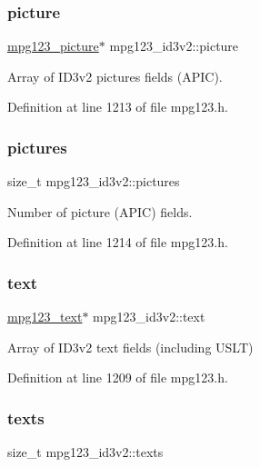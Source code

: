 \subsubsection{\texorpdfstring{picture}{picture}}
{\footnotesize\ttfamily \mbox{\hyperlink{structmpg123__picture}{mpg123\+\_\+picture}}$\ast$ mpg123\+\_\+id3v2\+::picture}

Array of I\+D3v2 pictures fields (A\+P\+IC). 

Definition at line 1213 of file mpg123.\+h.

\mbox{\label{structmpg123__id3v2_ac13f50ac1a8d70b8be6580a71efc89b5}} 
\subsubsection{\texorpdfstring{pictures}{pictures}}
{\footnotesize\ttfamily size\+\_\+t mpg123\+\_\+id3v2\+::pictures}

Number of picture (A\+P\+IC) fields. 

Definition at line 1214 of file mpg123.\+h.

\mbox{\label{structmpg123__id3v2_a2974751dc4b5bc34819d0acb1b90e944}} 
\subsubsection{\texorpdfstring{text}{text}}
{\footnotesize\ttfamily \mbox{\hyperlink{structmpg123__text}{mpg123\+\_\+text}}$\ast$ mpg123\+\_\+id3v2\+::text}

Array of I\+D3v2 text fields (including U\+S\+LT) 

Definition at line 1209 of file mpg123.\+h.

\mbox{\label{structmpg123__id3v2_a1ea43150e210d554f297bc317d5fb8ea}} 
\subsubsection{\texorpdfstring{texts}{texts}}
{\footnotesize\ttfamily size\+\_\+t mpg123\+\_\+id3v2\+::texts}

